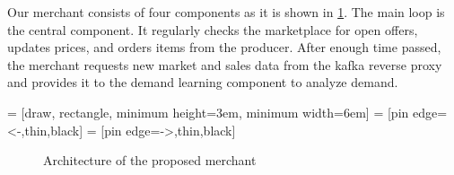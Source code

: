 Our merchant consists of four components as it is shown in \cref{fig:merchant_architecture}.
The main loop is the central component.
It regularly checks the marketplace for open offers, updates prices, and orders items from the producer.
After enough time passed, the merchant requests new market and sales data from the kafka reverse proxy and provides it to the demand learning component to analyze demand.

\bgroup
{} = [draw, rectangle, minimum height=3em, minimum width=6em]
 = [pin edge={<-,thin,black}]
 = [pin edge={->,thin,black}]


\renewcommand{\arraystretch}{0.4}

\begin{figure}[t]
\centering
{}
\caption{Architecture of the proposed merchant}
\label{fig:merchant_architecture}
\end{figure}
\egroup

